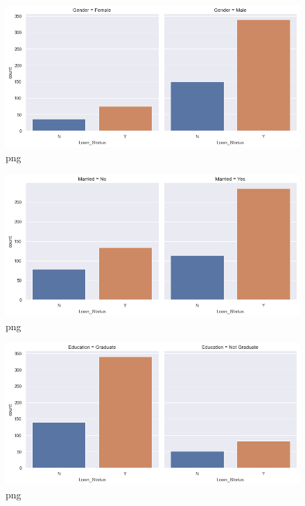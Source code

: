 \documentclass[]{article}
\begin{document}
\begin{figure}
\centering
\includegraphics{notebook_files/notebook_20_3.png}
\caption{png}
\end{figure}

\begin{figure}
\centering
\includegraphics{notebook_files/notebook_20_4.png}
\caption{png}
\end{figure}

\begin{figure}
\centering
\includegraphics{notebook_files/notebook_20_5.png}
\caption{png}
\end{figure}
\end{document}
